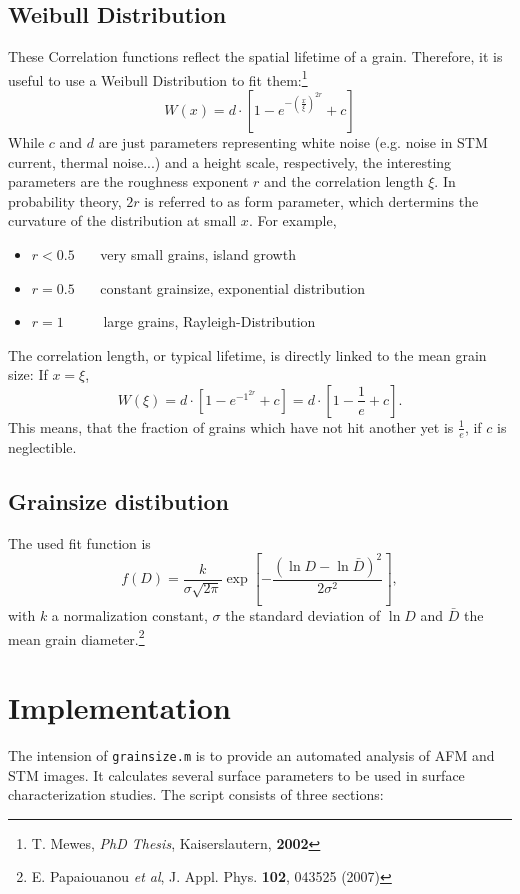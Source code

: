 \documentclass[11pt,a4paper]{article}
\newcommand{\grainsize}{\texttt{grainsize.m}\xspace}
\begin{document}
\subsection{Weibull Distribution}
These Correlation functions reflect the spatial lifetime of a grain. Therefore, it is useful to use a Weibull Distribution to fit them:\footnote{T. Mewes, {\it PhD Thesis}, Kaiserslautern, {\bf 2002}}
\begin{equation}
	 W(x)=d\cdot\left[ 1-e^{-{\left( \frac x \xi\right)}^{2r}}+c\right]
\end{equation}
While $c$ and $d$ are just parameters representing white noise (e.g. noise in STM current, thermal noise...) and a height scale, respectively, the interesting parameters are the roughness exponent $r$ and the correlation length $\xi$. In probability theory, $2r$ is referred to as form parameter, which dertermins the curvature of the distribution at small $x$. For example,
\begin{itemize}
\item $r<0.5$~~~ very small grains, island growth
\item $r=0.5$~~~ constant grainsize, exponential distribution
\item $r=1$~~~~~ large grains, Rayleigh-Distribution
\end{itemize}
The correlation length, or typical lifetime, is directly linked to the mean grain size: If $x=\xi$,
\begin{equation}
	W(\xi)=d\cdot\left[ 1-e^{-1^{2r}}+c\right]=d\cdot\left[ 1-\frac{1}{e}+c\right].
\end{equation}
This means, that the fraction of grains which have not hit another yet is $\frac{1}{e}$, if $c$ is neglectible.

\subsection{Grainsize distibution}
The used fit function is
\begin{equation}\label{gfit}
f(D)=\frac{k}{\sigma\sqrt{2\pi}}\exp\left[-\frac{\left(\ln D - \ln \bar{D}\right)^2}{2\sigma^2}\right],
\end{equation}
with $k$ a normalization constant, $\sigma$ the standard deviation of $\ln D$ and $\bar{D}$ the mean grain diameter.\footnote{E. Papaiouanou {\it et al}, J. Appl. Phys. {\bf 102}, 043525 (2007)}


\section{Implementation}
The intension of \grainsize is to provide an automated analysis of AFM and STM images. It calculates several surface parameters to be used in surface characterization studies. The script consists of three sections:
\end{document}
